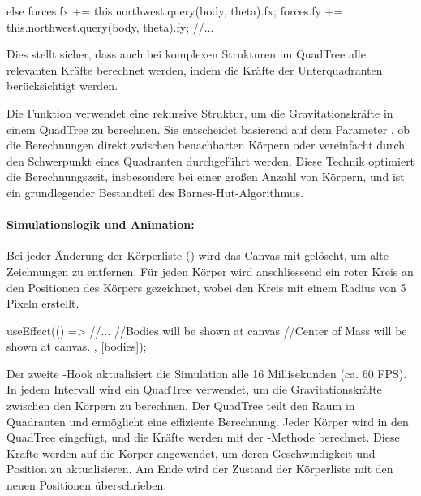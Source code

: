 \documentclass[a4paper,12pt,twoside]{article}
\begin{document}
\begin{javascript}
else {
    forces.fx += this.northwest.query(body, theta).fx;
    forces.fy += this.northwest.query(body, theta).fy;
    //...
}
\end{javascript}

Dies stellt sicher, dass auch bei komplexen Strukturen im QuadTree alle relevanten Kräfte berechnet werden, indem die Kräfte der Unterquadranten berücksichtigt werden.


Die Funktion  verwendet eine rekursive Struktur, um die Gravitationskräfte in einem QuadTree zu berechnen. Sie entscheidet basierend auf dem Parameter , ob die Berechnungen direkt zwischen benachbarten Körpern oder vereinfacht durch den Schwerpunkt eines Quadranten durchgeführt werden. Diese Technik optimiert die Berechnungszeit, insbesondere bei einer großen Anzahl von Körpern, und ist ein grundlegender Bestandteil des Barnes-Hut-Algorithmus.


\paragraph{Simulationslogik und Animation:}

Bei jeder Änderung der Körperliste () wird das Canvas mit  gelöscht, um alte Zeichnungen zu entfernen. Für jeden Körper wird anschliessend ein roter Kreis an den Positionen des Körpers gezeichnet, wobei  den Kreis mit einem Radius von 5 Pixeln erstellt.

\begin{javascript}
    useEffect(() => {
        //...
        //Bodies will be shown at canvas
        //Center of Mass will be shown at canvas.
    }, [bodies]);

\end{javascript}


Der zweite -Hook aktualisiert die Simulation alle 16 Millisekunden (ca. 60 FPS). In jedem Intervall wird ein QuadTree verwendet, um die Gravitationskräfte zwischen den Körpern zu berechnen. Der QuadTree teilt den Raum in Quadranten und ermöglicht eine effiziente Berechnung. Jeder Körper wird in den QuadTree eingefügt, und die Kräfte werden mit der -Methode berechnet. Diese Kräfte werden auf die Körper angewendet, um deren Geschwindigkeit und Position zu aktualisieren. Am Ende wird der Zustand der Körperliste mit den neuen Positionen überschrieben.
\end{document}
